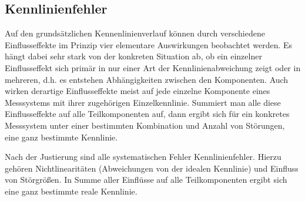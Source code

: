 \documentclass[letterpaper,10pt,english]{jupyterBook}
\begin{document}
\subsection{Kennlinienfehler}
\label{\detokenize{content/2_realeKennlinie:kennlinienfehler}}
\sphinxAtStartPar


\sphinxAtStartPar
Auf den grundsätzlichen Kennenlinienverlauf können durch verschiedene Einflusseffekte im Prinzip vier elementare Auswirkungen beobachtet werden.
Es hängt dabei sehr stark von der konkreten Situation ab, ob ein einzelner Einflusseffekt sich primär in nur einer Art der Kennlinienabweichung zeigt oder in mehreren, d.h. es entstehen Abhängigkeiten zwischen den Komponenten.
Auch wirken derartige Einflusseffekte meist auf jede einzelne Komponente eines Messsystems mit ihrer zugehörigen Einzelkennlinie. Summiert man alle diese Einflusseffekte auf alle Teilkomponenten auf, dann ergibt sich für ein konkretes Messsystem unter einer bestimmten Kombination und Anzahl von Störungen, eine ganz bestimmte  Kennlinie.

\sphinxAtStartPar
Nach der Justierung sind alle systematischen Fehler Kennlinienfehler. Hierzu gehören Nichtlinearitäten (Abweichungen von der idealen Kennlinie) und Einfluss von Störgrößen. In Summe aller Einflüsse auf alle Teilkomponenten ergibt sich eine ganz bestimmte reale Kennlinie.
\end{document}
